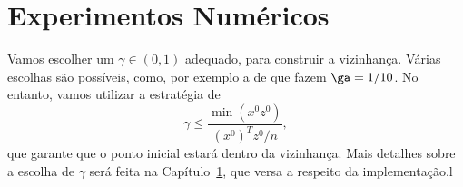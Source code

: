 \chapter{Experimentos Numéricos}
\label{chap:numerical}

Vamos escolher um $\gamma\in(0,1)$ adequado, para construir a vizinhança. Várias escolhas são possíveis, como, por exemplo a de \textcite{Colombo:2008ia} que fazem $\ga = 1/10$. No entanto, vamos utilizar a estratégia de \textcite{Zhang:2006ic}
\[
\gamma \leq \frac{\min(x^0z^0)}{(x^0)^Tz^0/n},
\]
que garante que o ponto inicial estará dentro da vizinhança. Mais detalhes sobre a escolha de $\gamma$ será feita na Capítulo~\ref{chap:numerical}, que versa a respeito da implementação.l